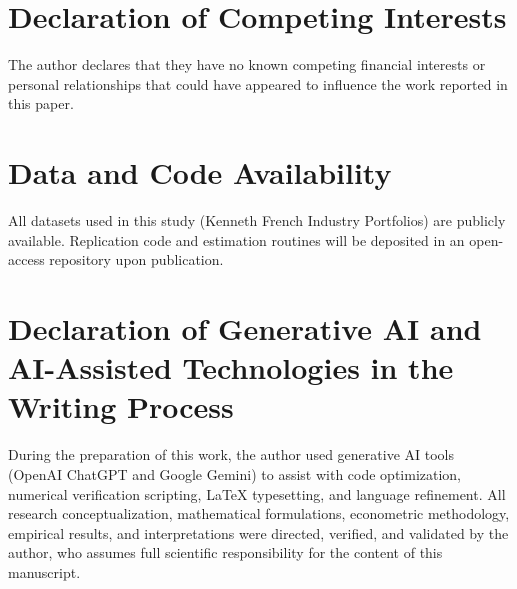 \documentclass[review,12pt,authoryear]{elsarticle}
\begin{document}
\section*{Declaration of Competing Interests}
The author declares that they have no known competing financial interests or personal relationships that could have appeared to influence the work reported in this paper.

\section*{Data and Code Availability}
All datasets used in this study (Kenneth French Industry Portfolios) are publicly available. Replication code and estimation routines will be deposited in an open-access repository upon publication.

\section*{Declaration of Generative AI and AI-Assisted Technologies in the Writing Process}
During the preparation of this work, the author used generative AI tools (OpenAI ChatGPT and Google Gemini) to assist with code optimization, numerical verification scripting, LaTeX typesetting, and language refinement. All research conceptualization, mathematical formulations, econometric methodology, empirical results, and interpretations were directed, verified, and validated by the author, who assumes full scientific responsibility for the content of this manuscript.
\end{document}
